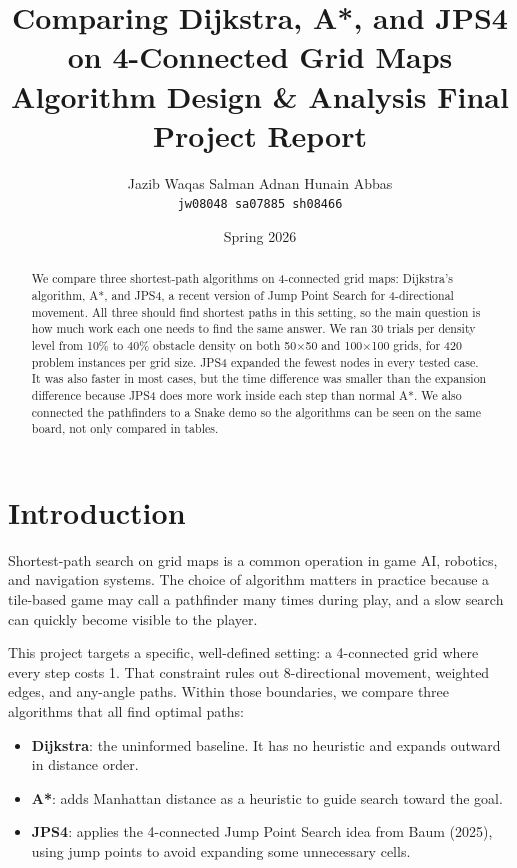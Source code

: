 \documentclass[11pt,a4paper]{article}
\title{\textbf{Comparing Dijkstra, A*, and JPS4 on 4-Connected Grid Maps}\\[4pt]
\large Algorithm Design \& Analysis Final Project Report}
\author{
  Jazib Waqas \quad Salman Adnan \quad Hunain Abbas \\
  \texttt{jw08048 \quad sa07885 \quad sh08466}
}
\date{Spring 2026}
\begin{document}
\maketitle

\begin{abstract}
We compare three shortest-path algorithms on 4-connected grid maps: Dijkstra's algorithm, A*, and JPS4, a recent version of Jump Point Search for 4-directional movement. All three should find shortest paths in this setting, so the main question is how much work each one needs to find the same answer. We ran 30 trials per density level from 10\% to 40\% obstacle density on both 50$\times$50 and 100$\times$100 grids, for 420 problem instances per grid size. JPS4 expanded the fewest nodes in every tested case. It was also faster in most cases, but the time difference was smaller than the expansion difference because JPS4 does more work inside each step than normal A*. We also connected the pathfinders to a Snake demo so the algorithms can be seen on the same board, not only compared in tables.
\end{abstract}

\section{Introduction}

Shortest-path search on grid maps is a common operation in game AI, robotics, and navigation systems. The choice of algorithm matters in practice because a tile-based game may call a pathfinder many times during play, and a slow search can quickly become visible to the player.

This project targets a specific, well-defined setting: a 4-connected grid where every step costs 1. That constraint rules out 8-directional movement, weighted edges, and any-angle paths. Within those boundaries, we compare three algorithms that all find optimal paths:

\begin{itemize}[nosep]
  \item \textbf{Dijkstra}: the uninformed baseline. It has no heuristic and expands outward in distance order.
  \item \textbf{A*}: adds Manhattan distance as a heuristic to guide search toward the goal.
  \item \textbf{JPS4}: applies the 4-connected Jump Point Search idea from Baum (2025), using jump points to avoid expanding some unnecessary cells.
\end{itemize}
\end{document}
